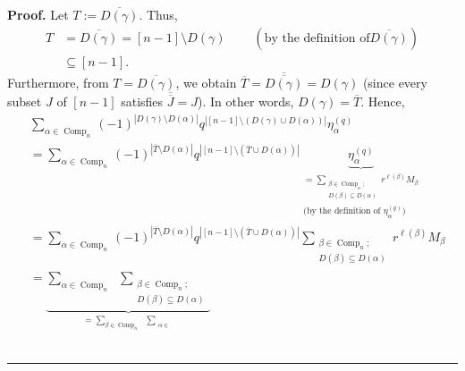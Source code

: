 \documentclass[numbers=enddot,12pt,final,onecolumn,notitlepage]{scrartcl}%
\theoremstyle{definition}
\newenvironment{proof}[1][Proof]{\noindent\textbf{#1.} }{\ \rule{0.5em}{0.5em}}
\let\sumnonlimits\sum
\renewcommand{\sum}{\sumnonlimits\limits}
\newenvironment{verlong}{}{}
\begin{document}
\begin{verlong}
\begin{proof}
Let $T:=\overline{D\left(  \gamma\right)  }$. Thus,
\begin{align*}
T  &  =\overline{D\left(  \gamma\right)  }=\left[  n-1\right]  \setminus
D\left(  \gamma\right)  \ \ \ \ \ \ \ \ \ \ \left(  \text{by the definition of
}\overline{D\left(  \gamma\right)  }\right) \\
&  \subseteq\left[  n-1\right]  .
\end{align*}
Furthermore, from $T=\overline{D\left(  \gamma\right)  }$, we obtain
$\overline{T}=\overline{\overline{D\left(  \gamma\right)  }}=D\left(
\gamma\right)  $ (since every subset $J$ of $\left[  n-1\right]  $ satisfies
$\overline{\overline{J}}=J$). In other words, $D\left(  \gamma\right)
=\overline{T}$. Hence,%
\begin{align}
&  \sum_{\alpha\in\operatorname*{Comp}\nolimits_{n}}\left(  -1\right)
^{\left\vert D\left(  \gamma\right)  \setminus D\left(  \alpha\right)
\right\vert }q^{\left\vert \left[  n-1\right]  \setminus\left(  D\left(
\gamma\right)  \cup D\left(  \alpha\right)  \right)  \right\vert }\eta
_{\alpha}^{\left(  q\right)  }\nonumber\\
&  =\sum_{\alpha\in\operatorname*{Comp}\nolimits_{n}}\left(  -1\right)
^{\left\vert \overline{T}\setminus D\left(  \alpha\right)  \right\vert
}q^{\left\vert \left[  n-1\right]  \setminus\left(  \overline{T}\cup D\left(
\alpha\right)  \right)  \right\vert }\underbrace{\eta_{\alpha}^{\left(
q\right)  }}_{\substack{=\sum_{\substack{\beta\in\operatorname*{Comp}%
\nolimits_{n};\\D\left(  \beta\right)  \subseteq D\left(  \alpha\right)
}}r^{\ell\left(  \beta\right)  }M_{\beta}\\\text{(by the definition of }%
\eta_{\alpha}^{\left(  q\right)  }\text{)}}}\nonumber\\
&  =\sum_{\alpha\in\operatorname*{Comp}\nolimits_{n}}\left(  -1\right)
^{\left\vert \overline{T}\setminus D\left(  \alpha\right)  \right\vert
}q^{\left\vert \left[  n-1\right]  \setminus\left(  \overline{T}\cup D\left(
\alpha\right)  \right)  \right\vert }\sum_{\substack{\beta\in
\operatorname*{Comp}\nolimits_{n};\\D\left(  \beta\right)  \subseteq D\left(
\alpha\right)  }}r^{\ell\left(  \beta\right)  }M_{\beta}\nonumber\\
&  =\underbrace{\sum_{\alpha\in\operatorname*{Comp}\nolimits_{n}}%
\ \ \sum_{\substack{\beta\in\operatorname*{Comp}\nolimits_{n};\\D\left(
\beta\right)  \subseteq D\left(  \alpha\right)  }}}_{=\sum_{\beta
\in\operatorname*{Comp}\nolimits_{n}}\ \ \sum_{\substack{\alpha\in
}}}
\end{align}
\end{proof}
\end{verlong}
\end{document}
